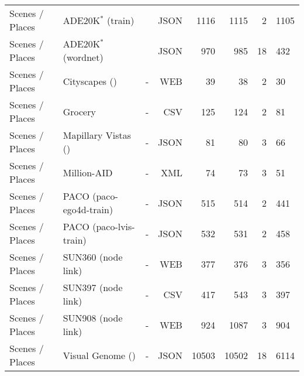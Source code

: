 \begin{table}
\begin{tabular}{lll|rrrr}
Scenes / Places & ADE20K$^*$ (train) & \cite{atigh2022hyperbolic} & JSON & 1116 & 1115 & 2 & 1105 \\
Scenes / Places & ADE20K$^*$ (wordnet) & \cite{atigh2022hyperbolic} & JSON & 970 & 985 & 18 & 432 \\
Scenes / Places & Cityscapes () & - & WEB & 39 & 38 & 2 & 30 \\
Scenes / Places & Grocery & - & CSV & 125 & 124 & 2 & 81 \\
Scenes / Places & Mapillary Vistas () & - & JSON & 81 & 80 & 3 & 66 \\
Scenes / Places & Million-AID & - & XML & 74 & 73 & 3 & 51 \\
Scenes / Places & PACO (paco-ego4d-train) & - & JSON & 515 & 514 & 2 & 441 \\
Scenes / Places & PACO (paco-lvis-train) & - & JSON & 532 & 531 & 2 & 458 \\
Scenes / Places & SUN360 (node link) & - & WEB & 377 & 376 & 3 & 356 \\
Scenes / Places & SUN397 (node link) & - & CSV & 417 & 543 & 3 & 397 \\
Scenes / Places & SUN908 (node link) & - & WEB & 924 & 1087 & 3 & 904 \\
Scenes / Places & Visual Genome () & - & JSON & 10503 & 10502 & 18 & 6114 \\
\bottomrule
\end{tabular}
\end{table}
